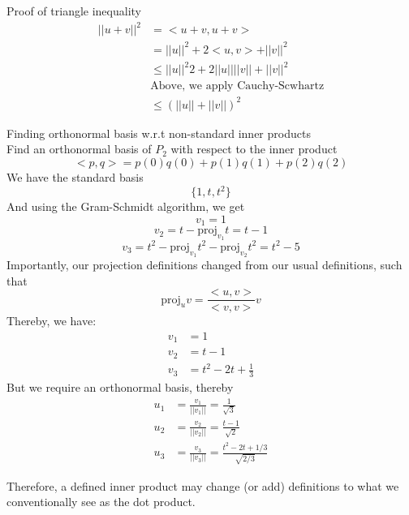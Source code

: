 \documentclass[journal, letterpaper]{IEEEtran}
\begin{document}
    \begin{myboxr}{Proof of triangle inequality}
        \begin{align*}
            ||u+v||^2 &= <u+v, u+ v> \\
            &= ||u||^2 + 2<u, v> + ||v||^2  \\
            &\le ||u||^2 2+ 2||u|| ||v|| + ||v||^2 \\
            &\text{Above, we apply Cauchy-Scwhartz} \\
            &\le (||u|| + ||v||)^2
        \end{align*}
    \end{myboxr}
    \begin{myboxg}{Finding orthonormal basis w.r.t non-standard inner products} \\
        Find an orthonormal basis of $P_2$ with respect to the inner product
        $$ <p, q> = p(0)q(0) + p(1)q(1) + p(2)q(2)$$
        We have the standard basis
        $$ \{1, t, t^2 \}$$
        And using the Gram-Schmidt algorithm, we get
        $$
        v_1 = 1
        $$
        $$
        v_2 = t - \text{proj}_{v_1}t = t - 1
        $$
        $$
        v_3 = t^2 - \text{proj}_{v_1}t^2 - \text{proj}_{v_2}t^2 = t^2 - 5 
        $$
        Importantly, our projection definitions changed from our usual definitions, such that
        $$ 
        \text{proj}_{u}v = \frac{<u, v>}{<v, v>}v
        $$
        Thereby, we have:
        \begin{align*}
            v_1 &= 1 \\
            v_2 &= t - 1 \\ 
            v_3 &= t^2 - 2t + \frac{1}{3}
        \end{align*}
        But we require an orthonormal basis, thereby
        \begin{align*}
            u_1 &= \frac{v_1}{||v_1||} = \frac{1}{\sqrt{3}}\\
            u_2 &= \frac{v_2}{||v_2||} = \frac{t - 1}{\sqrt{2}}\\
            u_3 &= \frac{v_3}{||v_3||} = \frac{t^2 - 2t + 1/3}{\sqrt{2/3}}
        \end{align*}
    \end{myboxg}
    Therefore, a defined inner product may change (or add) definitions to what we conventionally see as the dot product.
\end{document}
